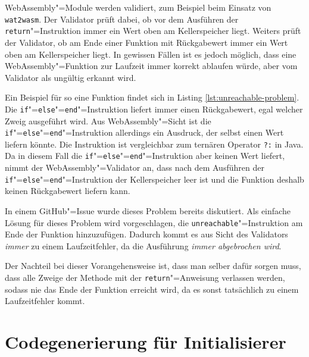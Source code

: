 WebAssembly"=Module werden validiert, zum Beispiel beim Einsatz von \lstinline{wat2wasm}. Der Validator prüft dabei, ob vor dem Ausführen der \lstinline{return}"=Instruktion immer ein Wert oben am Kellerspeicher liegt. Weiters prüft der Validator, ob am Ende einer Funktion mit Rückgabewert immer ein Wert oben am Kellerspeicher liegt. In gewissen Fällen ist es jedoch möglich, dass eine WebAssembly"=Funktion zur Laufzeit immer korrekt ablaufen würde, aber vom Validator als ungültig erkannt wird.

Ein Beispiel für so eine Funktion findet sich in Listing \ref{lst:unreachable-problem}. Die \lstinline{if}"=\lstinline{else}"=\lstinline{end}"=Instruktion liefert immer einen Rückgabewert, egal welcher Zweig ausgeführt wird. Aus WebAssembly"=Sicht ist die \lstinline{if}"=\lstinline{else}"=\lstinline{end}"=Instruktion allerdings ein Ausdruck, der selbst einen Wert liefern könnte. Die Instruktion ist vergleichbar zum ternären Operator \lstinline{?:} in Java. Da in diesem Fall die \lstinline{if}"=\lstinline{else}"=\lstinline{end}"=Instruktion aber keinen Wert liefert, nimmt der WebAssembly"=Validator an, dass nach dem Ausführen der \lstinline{if}"=\lstinline{else}"=\lstinline{end}"=Instruktion der Kellerspeicher leer ist und die Funktion deshalb keinen Rückgabewert liefern kann.



In einem GitHub"=Issue \cite{WebAssemblyUnreachableWorkaround} wurde dieses Problem bereits diskutiert. Als einfache Lösung für dieses Problem wird vorgeschlagen, die \lstinline{unreachable}"=Instruktion am Ende der Funktion hinzuzufügen. Dadurch kommt es aus Sicht des Validators \emph{immer} zu einem Laufzeitfehler, da die Ausführung \emph{immer abgebrochen wird}.

Der Nachteil bei dieser Vorangehensweise ist, dass man selber dafür sorgen muss, dass alle Zweige der Methode mit der \lstinline{return}"=Anweisung verlassen werden, sodass nie das Ende der Funktion erreicht wird, da es sonst tatsächlich zu einem Laufzeitfehler kommt.

\section{Codegenerierung für Initialisierer}

